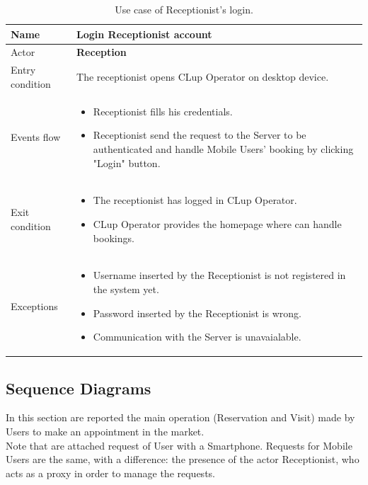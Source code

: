\begin{table}[H]\begin{tabular}{|p{5cm} | p{7cm} | }
	\hline
	Name & \textbf{Login Receptionist account} \\
	\hline
	Actor & \textbf{Reception} \\
	\hline
	Entry condition &
	The receptionist opens CLup Operator on desktop device.  \\
	\hline
	Events flow & 
	\begin{itemize}
		\item Receptionist fills his credentials.
		\item Receptionist send the request to the Server to be authenticated and handle Mobile Users' booking by clicking "Login" button.
	\end{itemize} \\
	\hline
	Exit condition & \begin{itemize}
	\item The receptionist has logged in CLup Operator.
    \item CLup Operator provides the homepage where can handle bookings.
    \end{itemize}
    \\
	\hline 
	Exceptions & 
	\begin{itemize}
		\item Username inserted by the Receptionist is not registered in the system yet.
	    \item Password inserted by the Receptionist is wrong.
        \item Communication with the Server is unavaialable.
	\end{itemize} \\
	\hline
\end{tabular}
\caption{Use case of Receptionist's login.}
\end{table}

\pagebreak

\subsection{Sequence Diagrams}
In this section are reported the main operation (Reservation and Visit) made by  Users to make an appointment in the market.\\
Note that are attached request of User with a Smartphone. Requests for Mobile Users are the same, with a difference: the presence of the actor Receptionist, who acts as a proxy in order to manage the requests.


